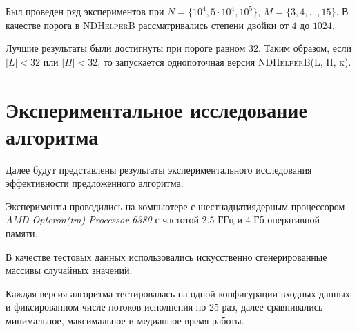 Был проведен ряд экспериментов при $N=\{10^4, 5\cdot10^4, 10^5\}$, $M=\{3,4,\ldots,15\}$.
В качестве порога в \textsc{NDHelperB} рассматривались степени двойки от $4$ до $1024$.

Лучшие результаты были достигнуты при пороге равном $32$.
Таким образом, если $|L| < 32$ или $|H| < 32$, то запускается однопоточная версия \textsc{NDHelperB(L, H, k)}.

\section{Экспериментальное исследование алгоритма}
Далее будут представлены результаты экспериментального исследования эффективности предложенного алгоритма.

Эксперименты проводились на компьютере с шестнадцатиядерным процессором \textit{AMD Opteron(tm) Processor 6380} с частотой 2.5 ГГц и 4 Гб оперативной памяти.

В качестве тестовых данных использовались искусственно сгенерированные массивы случайных значений. 

Каждая версия алгоритма тестировалась на одной конфигурации входных данных и фиксированном числе потоков исполнения по 25 раз, далее сравнивались минимальное, максимальное и медианное время работы.


